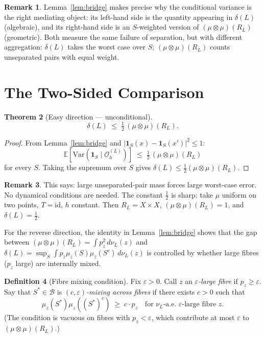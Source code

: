 \documentclass[11pt]{article}
\newtheorem{theorem}{Theorem}[section]
\theoremstyle{definition}
\newtheorem{definition}[theorem]{Definition}
\newtheorem{remark}[theorem]{Remark}
\newcommand{\Bcal}{\mathcal{B}}
\newcommand{\OL}{\mathcal{O}_h^{(L)}}
\newcommand{\RL}{R_L}
\newcommand{\dL}{\delta(L)}
\begin{document}
\begin{remark}
Lemma~\ref{lem:bridge} makes precise why the conditional variance is the
right mediating object:
its left-hand side is the quantity appearing in $\dL$ (algebraic),
and its right-hand side is an $S$-weighted version of $(\mu\otimes\mu)(\RL)$
(geometric).
Both measure the same failure of separation, but with different aggregation:
$\dL$ takes the worst case over $S$;
$(\mu\otimes\mu)(\RL)$ counts unseparated pairs with equal weight.
\end{remark}

\section{The Two-Sided Comparison}

\begin{theorem}[Easy direction --- unconditional]
\label{thm:easy}
\[
  \dL \;\leq\; \tfrac{1}{2}\,(\mu \otimes \mu)(\RL).
\]
\end{theorem}

\begin{proof}
From Lemma~\ref{lem:bridge} and $|\mathbf{1}_S(x) - \mathbf{1}_S(x')|^2 \leq 1$:
\[
  \mathbb{E}[\mathrm{Var}(\mathbf{1}_S \mid \OL)]
  \;\leq\; \tfrac{1}{2}\,(\mu \otimes \mu)(\RL)
\]
for every $S$.
Taking the supremum over $S$ gives $\dL \leq \tfrac{1}{2}(\mu\otimes\mu)(\RL)$.
\end{proof}

\begin{remark}
This says: large unseparated-pair mass forces large worst-case error.
No dynamical conditions are needed.
The constant $\tfrac{1}{2}$ is sharp: take $\mu$ uniform on two points,
$T = \mathrm{id}$, $h$ constant. Then $\RL = X \times X$,
$(\mu\otimes\mu)(\RL) = 1$, and $\dL = \tfrac{1}{2}$.
\end{remark}

For the reverse direction, the identity in Lemma~\ref{lem:bridge} shows that
the gap between $(\mu\otimes\mu)(\RL) = \int p_z^2\,d\nu_L(z)$ and
$\dL = \sup_S \int p_z \mu_z(S)\mu_z(S^c)\,d\nu_L(z)$ is controlled
by whether large fibres ($p_z$ large) are internally mixed.

\begin{definition}[Fibre mixing condition]
\label{def:fibre-mixing}
Fix $\varepsilon > 0$.
Call $z$ an \emph{$\varepsilon$-large fibre} if $p_z \geq \varepsilon$.
Say that $S^* \in \Bcal$ is \emph{$(c,\varepsilon)$-mixing across fibres} if there
exists $c > 0$ such that
\[
  \mu_z(S^*)\mu_z((S^*)^c) \;\geq\; c \cdot p_z
  \quad \text{for $\nu_L$-a.e.\ $\varepsilon$-large fibre } z.
\]
(The condition is vacuous on fibres with $p_z < \varepsilon$, which contribute at
most $\varepsilon$ to $(\mu\otimes\mu)(\RL)$.)
\end{definition}
\end{document}
